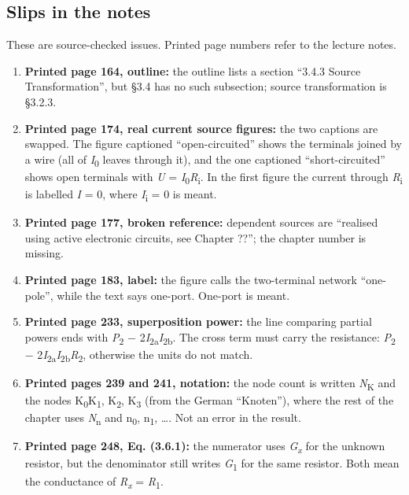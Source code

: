 \documentclass[11pt]{article}
\begin{document}
\begin{keepsection}
\section{Slips in the notes}

These are source-checked issues. Printed page numbers refer to the lecture notes.

\begin{enumerate}
\item \textbf{Printed page 164, outline:} the outline lists a section “3.4.3 Source Transformation”, but §3.4 has no such subsection; source transformation is §3.2.3.
\item \textbf{Printed page 174, real current source figures:} the two captions are swapped. The figure captioned “open-circuited” shows the terminals joined by a wire (all of \textit{I}\textsubscript{0} leaves through it), and the one captioned “short-circuited” shows open terminals with \textit{U} = \textit{I}\textsubscript{0}\textit{R}\textsubscript{i}. In the first figure the current through \textit{R}\textsubscript{i} is labelled \textit{I} = 0, where \textit{I}\textsubscript{i} = 0 is meant.
\item \textbf{Printed page 177, broken reference:} dependent sources are “realised using active electronic circuits, see Chapter ??”; the chapter number is missing.
\item \textbf{Printed page 183, label:} the figure calls the two-terminal network “one-pole”, while the text says one-port. One-port is meant.
\item \textbf{Printed page 233, superposition power:} the line comparing partial powers ends with \textit{P}\textsubscript{2} \ensuremath{-} 2\textit{I}\textsubscript{2a}\textit{I}\textsubscript{2b}. The cross term must carry the resistance: \textit{P}\textsubscript{2} \ensuremath{-} 2\textit{I}\textsubscript{2a}\textit{I}\textsubscript{2b}\textit{R}\textsubscript{2}, otherwise the units do not match.
\item \textbf{Printed pages 239 and 241, notation:} the node count is written \textit{N}\textsubscript{K} and the nodes K\textsubscript{0}K\textsubscript{1}, K\textsubscript{2}, K\textsubscript{3} (from the German “Knoten”), where the rest of the chapter uses \textit{N}\textsubscript{n} and n\textsubscript{0}, n\textsubscript{1}, …. Not an error in the result.
\item \textbf{Printed page 248, Eq. (3.6.1):} the numerator uses \textit{G}\textsubscript{\textit{x}} for the unknown resistor, but the denominator still writes \textit{G}\textsubscript{1} for the same resistor. Both mean the conductance of \textit{R}\textsubscript{\textit{x}} = \textit{R}\textsubscript{1}.
\end{enumerate}
\end{keepsection}
\end{document}
